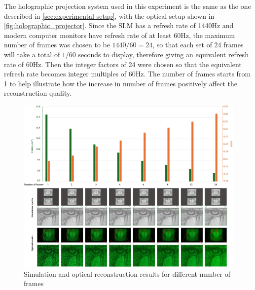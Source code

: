 	The holographic projection system used in this experiment is the same as the one described in \cref{sec:experimental setup}, with the optical setup shown in \cref{fig:holographic_projector}. Since the SLM has a refresh rate of 1440Hz and modern computer monitors have refresh rate of at least 60Hz, the maximum number of frames was chosen to be $1440/60=24$, so that each set of 24 frames will take a total of $1/60$ seconds to display, therefore giving an equivalent refresh rate of 60Hz. Then the integer factors of 24 were chosen so that the equivalent refresh rate becomes integer multiples of 60Hz. The number of frames starts from 1 to help illustrate how the increase in number of frames positively affect the reconstruction quality.

	\begin{figure}[H]
		\centering
		\includegraphics[width=1.0\textwidth]{recon_quality_vs_num_frames.pdf}
		\caption{Simulation and optical reconstruction results for different number of frames}
		\label{fig:recon_quality_vs_num_frames}
	\end{figure}

